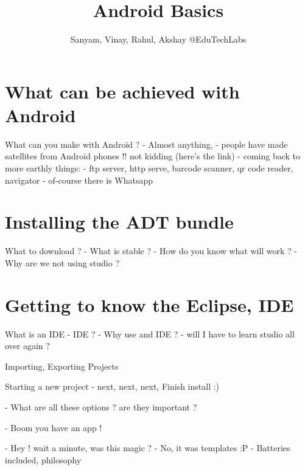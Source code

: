 \documentclass[11pt]{beamer}
\author{Sanyam, Vinay, Rahul, Akshay @EduTechLabs}
\title{Android Basics}
\begin{document}
\begin{frame}
\titlepage
\end{frame}


\section{What can be achieved with Android}

\begin{frame}[containsverbatim]{What can you make with Android ?}
- Almost anything,
- people have made satellites from Android phones !! not kidding (here's the link)
- coming back to more earthly things:
- ftp server, http serve, barcode scanner, qr code reader, navigator 
- of-course there is Whatsapp

\end{frame}


\section{Installing the ADT bundle}

\begin{frame}[containsverbatim]{What to download ?}
 - What is stable ?
 - How do you know what will work ?
 - Why are we not using studio ?
\end{frame}

\section{Getting to know the Eclipse, IDE}

\begin{frame}[containsverbatim]{What is an IDE}
- IDE ? 
- Why use and IDE ?
- will I have to learn studio all over again ?

\end{frame}

\begin{frame}[containsverbatim]{Importing, Exporting Projects}

\end{frame}

\begin{frame}[containsverbatim]{Starting a new project}
- next, next, next, Finish install :)

- What are all these options ? are they important ?

- Boom you have an app !

- Hey ! wait a minute, was this magic ? 
- No, it was templates :P
- Batteries included, philosophy 
\end{frame}
\end{document}
